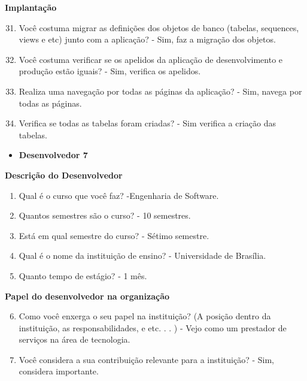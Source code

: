 \begin{anexosenv}
\textbf{Implantação}

\begin{enumerate}
\setcounter{enumi}{30}
\item Você costuma migrar as definições dos objetos de banco (tabelas, sequences, views e
etc) junto com a aplicação?\newline
- Sim, faz a migração dos objetos.
\item Você costuma verificar se os apelidos da aplicação de desenvolvimento e produção
estão iguais?\newline
- Sim, verifica os apelidos.
\item Realiza uma navegação por todas as páginas da aplicação?\newline
- Sim, navega por todas as páginas.
\item Verifica se todas as tabelas foram criadas?\newline
- Sim verifica a criação das tabelas.
\end{enumerate}



\begin{itemize}
\item \textbf{Desenvolvedor 7}
\end{itemize}

\textbf{Descrição do Desenvolvedor}

\begin{enumerate}
\item Qual é o curso que você faz?\newline
-Engenharia de Software.
\item Quantos semestres são o curso?\newline
- 10 semestres.
\item Está em qual semestre do curso?\newline
- Sétimo semestre.
\item Qual é o nome da instituição de ensino?\newline
- Universidade de Brasília.
\item Quanto tempo de estágio?\newline
- 1 mês.
\end{enumerate}

\textbf{Papel do desenvolvedor na organização}

\begin{enumerate}
\setcounter{enumi}{5}
\item Como você enxerga o seu papel na instituição? (A posição dentro da instituição, as
responsabilidades, e etc. . . )\newline
- Vejo como um prestador de serviços na área de tecnologia.
\item Você considera a sua contribuição relevante para a instituição?\newline
- Sim, considera importante.
\end{enumerate}


\end{anexosenv}
